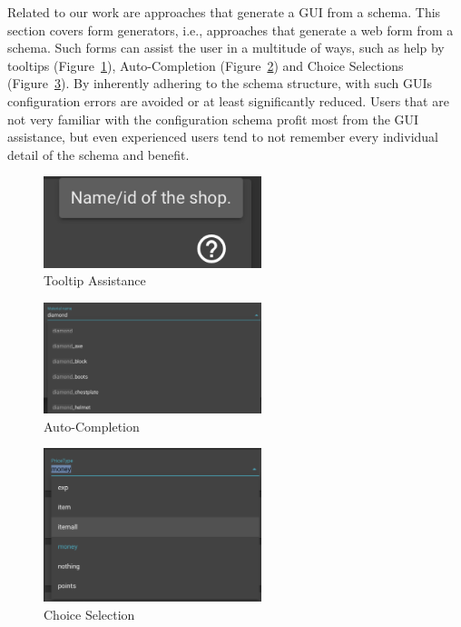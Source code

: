 Related to our work are approaches that generate a GUI from a schema.
This section covers form generators, i.e., approaches that generate a web form from a schema.
Such forms can assist the user in a multitude of ways, such as help by tooltips (Figure~\ref{fig:gui_advantage_tooltip}), Auto-Completion (Figure~\ref{fig:gui_advantage_autocomplete}) and Choice Selections (Figure~\ref{fig:gui_advantage_choiceselection}).
By inherently adhering to the schema structure, with such GUIs configuration errors are avoided or at least significantly reduced.
Users that are not very familiar with the configuration schema profit most from the GUI assistance, but even experienced users tend to not remember every individual detail of the schema and benefit.

\begin{figure}[!t]
\centering
\includegraphics[width=2.5in]{figures/gui_advantage_tooltip}
\caption{Tooltip Assistance}
\label{fig:gui_advantage_tooltip}
\end{figure}

\begin{figure}[!t]
\centering
\includegraphics[width=2.5in]{figures/gui_advantage_autocomplete}
\caption{Auto-Completion}
\label{fig:gui_advantage_autocomplete}
\end{figure}

\begin{figure}[!t]
\centering
\includegraphics[width=2.5in]{figures/gui_advantage_choiceselection}
\caption{Choice Selection}
\label{fig:gui_advantage_choiceselection}
\end{figure}

